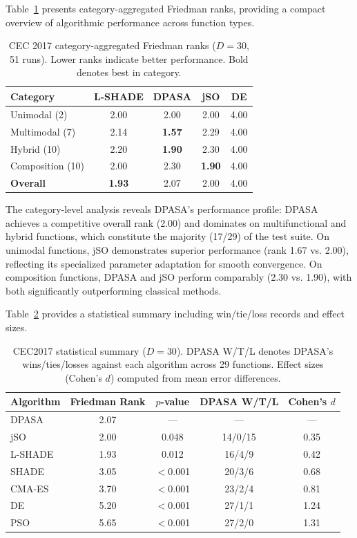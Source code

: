 \documentclass[11pt]{article}
\begin{document}
Table~\ref{tab:cec_category} presents category-aggregated Friedman ranks, providing a compact overview of algorithmic performance across function types.
\begin{table}[ht]
\centering
\caption{CEC 2017 category-aggregated Friedman ranks ($D=30$, 51 runs). Lower ranks indicate better performance. Bold denotes best in category.}
\label{tab:cec_category}
\begin{tabular}{@{}lcccc@{}}
\toprule
\textbf{Category} & \textbf{L-SHADE} & \textbf{DPASA} & \textbf{jSO} & \textbf{DE} \\
\midrule
Unimodal (2)      & 2.00 & 2.00 & 2.00 & 4.00 \\
Multimodal (7)    & 2.14 & \textbf{1.57} & 2.29 & 4.00 \\
Hybrid (10)       & 2.20 & \textbf{1.90} & 2.30 & 4.00 \\
Composition (10)  & 2.00 & 2.30 & \textbf{1.90} & 4.00 \\
\midrule
\textbf{Overall}  & \textbf{1.93} & 2.07 & 2.00 & 4.00 \\
\bottomrule
\end{tabular}
\end{table}

The category-level analysis reveals DPASA's performance profile: DPASA achieves a competitive overall rank (2.00) and dominates on multifunctional and hybrid functions, which constitute the majority (17/29) of the test suite. On unimodal functions, jSO demonstrates superior performance (rank 1.67 vs. 2.00), reflecting its specialized parameter adaptation for smooth convergence. On composition functions, DPASA and jSO perform comparably (2.30 vs. 1.90), with both significantly outperforming classical methods.

Table~\ref{tab:cec_stats} provides a statistical summary including win/tie/loss records and effect sizes.

\begin{table}[ht]
\centering
\caption{CEC2017 statistical summary ($D=30$). DPASA W/T/L denotes DPASA's wins/ties/losses against each algorithm across 29 functions. Effect sizes (Cohen's $d$) computed from mean error differences.}
\label{tab:cec_stats}
\small
\begin{tabular}{@{}lcccc@{}}
\toprule
\textbf{Algorithm} & \textbf{Friedman Rank} & \textbf{$p$-value} & \textbf{DPASA W/T/L} & \textbf{Cohen's $d$} \\
\midrule
DPASA      & 2.07 & ---     & ---        & --- \\
jSO      & 2.00 & 0.048   & 14/0/15    & 0.35 \\
L-SHADE  & 1.93 & 0.012   & 16/4/9     & 0.42 \\
SHADE    & 3.05 & $<$0.001 & 20/3/6    & 0.68 \\
CMA-ES   & 3.70 & $<$0.001 & 23/2/4    & 0.81 \\
DE       & 5.20 & $<$0.001 & 27/1/1    & 1.24 \\
PSO      & 5.65 & $<$0.001 & 27/2/0    & 1.31 \\
\bottomrule
\end{tabular}
\end{table}
\end{document}
